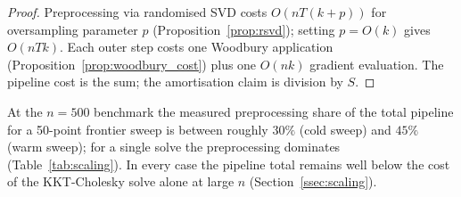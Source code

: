 \begin{proof}
Preprocessing via randomised SVD costs $O(nT(k+p))$ for oversampling parameter $p$
(Proposition~\ref{prop:rsvd}); setting $p = O(k)$ gives $O(nTk)$.
Each outer step costs one Woodbury application
(Proposition~\ref{prop:woodbury_cost}) plus one $O(nk)$ gradient evaluation.
The pipeline cost is the sum; the amortisation claim is division by $S$.
\end{proof}

At the $n=500$ benchmark the measured preprocessing share of the total
pipeline for a 50-point frontier sweep is between roughly $30\%$ (cold sweep)
and $45\%$ (warm sweep); for a single solve the preprocessing dominates
(Table~\ref{tab:scaling}). In every case the pipeline total remains well below
the cost of the KKT-Cholesky solve alone at large $n$
(Section~\ref{ssec:scaling}).
